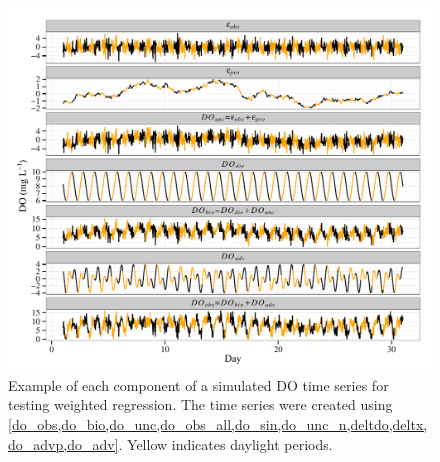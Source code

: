 \documentclass[letterpaper,12pt,oneside]{article}\usepackage[]{graphicx}\usepackage[]{color}
\makeatletter
\def\maxwidth{ %
  \ifdim\Gin@nat@width>\linewidth
    \linewidth
  \else
    \Gin@nat@width
  \fi
}
\newenvironment{knitrout}{}{} %
\makeatother
\begin{document}
\centering\vspace*{\fill}
\begin{knitrout}
\color{fgcolor}\begin{figure}[!ht]


{\centering \includegraphics[width=\maxwidth]{figure/do_sim} 

}

\caption[Example of each component of a simulated \ac{DO} time series for testing weighted regression]{Example of each component of a simulated \ac{DO} time series for testing weighted regression.  The time series were created using \cref{do_obs,do_bio,do_unc,do_obs_all,do_sin,do_unc_n,deltdo,deltx,do_advp,do_adv}. Yellow indicates daylight periods.\label{fig:do_sim}}
\end{figure}


\end{knitrout}
\vfill
\clearpage
\end{document}

